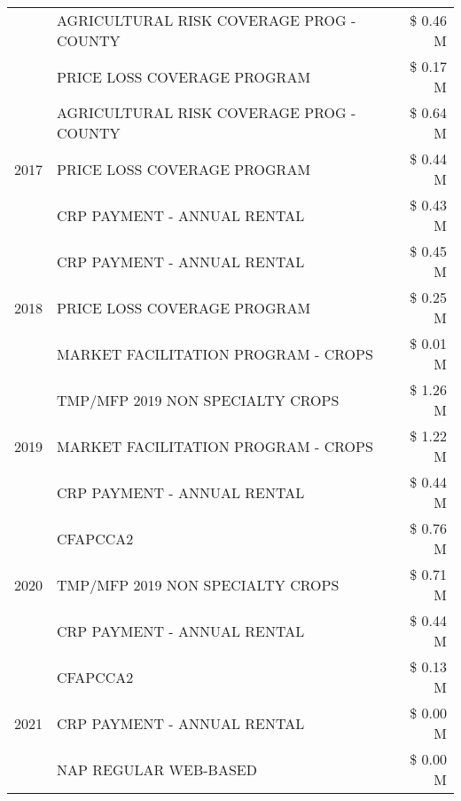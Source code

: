 \begin{tabular}{llr}
 & AGRICULTURAL RISK COVERAGE PROG - COUNTY & \$ 0.46 M \\
 & PRICE LOSS COVERAGE PROGRAM & \$ 0.17 M \\
\cline{1-3}
\multirow[t]{3}{*}{2017} & AGRICULTURAL RISK COVERAGE PROG - COUNTY & \$ 0.64 M \\
 & PRICE LOSS COVERAGE PROGRAM & \$ 0.44 M \\
 & CRP PAYMENT - ANNUAL RENTAL & \$ 0.43 M \\
\cline{1-3}
\multirow[t]{3}{*}{2018} & CRP PAYMENT - ANNUAL RENTAL & \$ 0.45 M \\
 & PRICE LOSS COVERAGE PROGRAM & \$ 0.25 M \\
 & MARKET FACILITATION PROGRAM - CROPS & \$ 0.01 M \\
\cline{1-3}
\multirow[t]{3}{*}{2019} & TMP/MFP 2019 NON SPECIALTY CROPS & \$ 1.26 M \\
 & MARKET FACILITATION PROGRAM - CROPS & \$ 1.22 M \\
 & CRP PAYMENT - ANNUAL RENTAL & \$ 0.44 M \\
\cline{1-3}
\multirow[t]{3}{*}{2020} & CFAPCCA2 & \$ 0.76 M \\
 & TMP/MFP 2019 NON SPECIALTY CROPS & \$ 0.71 M \\
 & CRP PAYMENT - ANNUAL RENTAL & \$ 0.44 M \\
\cline{1-3}
\multirow[t]{3}{*}{2021} & CFAPCCA2 & \$ 0.13 M \\
 & CRP PAYMENT - ANNUAL RENTAL & \$ 0.00 M \\
 & NAP REGULAR WEB-BASED & \$ 0.00 M \\
\cline{1-3}
\bottomrule
\end{tabular}
